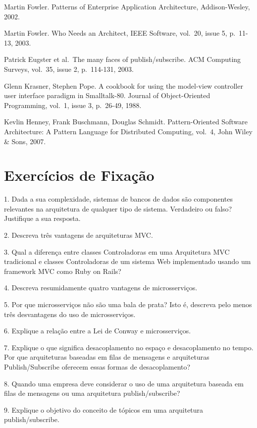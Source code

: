 \documentclass[
  11pt,
  twoside]{book}
\begin{document}
Martin Fowler. Patterns of Enterprise Application Architecture,
Addison-Wesley, 2002.

Martin Fowler. Who Needs an Architect, IEEE Software, vol.~20, issue 5,
p.~11-13, 2003.

Patrick Eugster et al.~The many faces of publish/subscribe. ACM
Computing Surveys, vol.~35, issue 2, p.~114-131, 2003.

Glenn Krasner, Stephen Pope. A cookbook for using the model-view
controller user interface paradigm in Smalltalk-80. Journal of
Object-Oriented Programming, vol.~1, issue 3, p.~26-49, 1988.

Kevlin Henney, Frank Buschmann, Douglas Schmidt. Pattern-Oriented
Software Architecture: A Pattern Language for Distributed Computing,
vol.~4, John Wiley \& Sons, 2007.

\hypertarget{exercuxedcios-de-fixauxe7uxe3o-6}{%
\section*{Exercícios de
Fixação}\label{exercuxedcios-de-fixauxe7uxe3o-6}}

1. Dada a sua complexidade, sistemas de bancos de dados são componentes
relevantes na arquitetura de qualquer tipo de sistema. Verdadeiro ou
falso? Justifique a sua resposta.

2. Descreva três vantagens de arquiteturas MVC.

3. Qual a diferença entre classes Controladoras em uma Arquitetura MVC
tradicional e classes Controladoras de um sistema Web implementado
usando um framework MVC como Ruby on Rails?

4. Descreva resumidamente quatro vantagens de microsserviços.

5. Por que microsserviços não são uma bala de prata? Isto é, descreva
pelo menos três desvantagens do uso de microsserviços.

6. Explique a relação entre a Lei de Conway e microsserviços.

7. Explique o que significa desacoplamento no espaço e desacoplamento no
tempo. Por que arquiteturas baseadas em filas de mensagens e
arquiteturas Publish/Subscribe oferecem essas formas de desacoplamento?

8. Quando uma empresa deve considerar o uso de uma arquitetura baseada
em filas de mensagens ou uma arquitetura publish/subscribe?

9. Explique o objetivo do conceito de tópicos em uma arquitetura
publish/subscribe.
\end{document}
